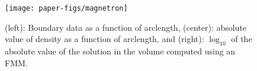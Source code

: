 \begin{figure}
\begin{center}
\texttt{[image: paper-figs/magnetron]}
\caption{(left): Boundary data as a function of arclength, (center): absolute value of density as a function of arclength, and 
(right): $\log_{10}$ of the absolute value of the solution in the volume computed using an FMM.}
\label{fig:magnetron}
\end{center}
\end{figure}
